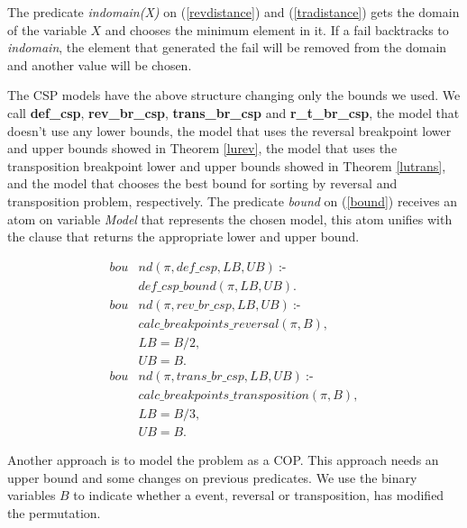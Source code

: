 The predicate \textit{indomain(X)} on (\ref{revdistance}) and
(\ref{tradistance}) gets the domain of the variable $X$ and chooses the
minimum element in it. If a fail backtracks to \textit{indomain}, the
element that generated the fail will be removed from the domain and
another value will be chosen.

The CSP models have the above structure changing only the bounds we
used. We call \textbf{def\_csp}, \textbf{rev\_br\_csp},
\textbf{trans\_br\_csp} and \textbf{r\_t\_br\_csp}, the model
that doesn't use any lower bounds, the model that uses the reversal
breakpoint lower and upper bounds showed in Theorem \ref{lurev}, the
model that uses the transposition breakpoint lower and upper bounds
showed in Theorem \ref{lutrans}, and the model that chooses the best
bound for sorting by reversal and transposition problem,
respectively. The predicate \textit{bound} on (\ref{bound}) receives
an atom on variable \textit{Model} that represents the chosen model,
this atom unifies with the clause that returns the appropriate lower
and upper bound.

\begin{align}
  \label{bound}
  \textit{bou}&\textit{nd}(\pi, def\_csp, LB, UB)~\text{:-} \nonumber\\
  &\textit{def\_csp\_bound}(\pi, LB, UB). \nonumber \\
  \textit{bou}&\textit{nd}(\pi, rev\_br\_csp, LB, UB)~\text{:-} \nonumber \\
  &\textit{calc\_breakpoints\_reversal}(\pi, B), \nonumber\\
  &LB = B / 2 ,  \\
  &UB = B. \nonumber \\
  \textit{bou}&\textit{nd}(\pi, trans\_br\_csp, LB, UB)~\text{:-} \nonumber\\
  &\textit{calc\_breakpoints\_transposition}(\pi, B), \nonumber\\
  &LB = B / 3, \nonumber \\
  &UB = B. \nonumber
\end{align}

Another approach is to model the problem as a COP. This approach needs
an upper bound and some changes on previous predicates. We use the
binary variables $B$ to indicate whether a event, reversal or
transposition, has modified the permutation.

